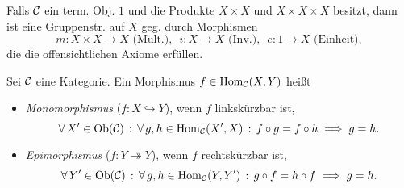 \documentclass{cheat-sheet}
\begin{document}
\begin{bem}
  Falls $\mathcal{C}$ ein term. Obj. $1$ und die Produkte $X \!\times\! X$ und $X \!\times\! X \!\times\! X$ besitzt, dann ist eine Gruppenstr. auf $X$ geg. durch Morphismen
  \[
    m : X \times X \to X \text{ (Mult.)}, \enspace
    i : X \to X \text{ (Inv.)}, \enspace
    e : 1 \to X \text{ (Einheit)},
  \]
  die die offensichtlichen Axiome erfüllen.
\end{bem}

\begin{defn}
  Sei $\mathcal{C}$ eine Kategorie. Ein Morphismus $f \in \operatorname{Hom}_{\mathcal{C}}(X, Y)$ heißt
  \begin{itemize}
    \item \emph{Monomorphismus} ($f : X \hookrightarrow Y$), wenn $f$ linkskürzbar ist, \dh{}
    \[
      \forall \, {X' \in \operatorname{Ob}(\mathcal{C})} \,:\, \forall \, {g, h \in \operatorname{Hom}_{\mathcal{C}}(X', X)} \,:\,
      f \circ g = f \circ h \implies g = h.
    \]
    \item \emph{Epimorphismus} ($f : Y \twoheadrightarrow Y$), wenn $f$ rechtskürzbar ist, \dh{}
    \[
      \forall \, {Y' \in \operatorname{Ob}(\mathcal{C})} \,:\, \forall \, {g, h \in \operatorname{Hom}_{\mathcal{C}}(Y, Y')} \,:\,
      g \circ f = h \circ f \implies g = h.
    \]
  \end{itemize}
\end{defn}
\end{document}
